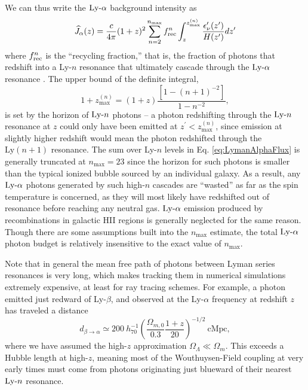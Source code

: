 We can thus write the $\text{Ly-}\alpha$ background intensity as
\begin{equation}
    \widehat{J}_{\alpha}(z) = \frac{c}{4\pi} (1 + z)^2 \sum_{n = 2}^{n_{\text{max}}} f_{\text{rec}}^{n} \int_z^{z_{\max}^{(n)}} \frac{\epsilon_{\nu}^{\prime}(z^{\prime})}{H(z^{\prime})} dz^{\prime} \label{eq:LymanAlphaFlux}
\end{equation}
where $f_{\text{rec}}^{n}$ is the ``recycling fraction,'' that is, the fraction of photons that redshift into a Ly-$n$ resonance that ultimately cascade through the $\text{Ly-}\alpha$ resonance \cite{Pritchard2006}. The upper bound of the definite integral,
\begin{equation}
    1 + z_{\max}^{(n)} = (1 + z) \frac{\left[1 - (n + 1)^{-2}\right]}{1 - n^{-2}} ,
\end{equation}
is set by the horizon of $\text{Ly-}n$ photons -- a photon redshifting through the  $\text{Ly-}n$ resonance at $z$ could only have been emitted at $z^{\prime} < z_{\max}^{(n)}$, since emission at slightly higher redshift would mean the photon redshifted through the $\text{Ly}(n+1)$ resonance. The sum over Ly-$n$ levels in Eq. \ref{eq:LymanAlphaFlux} is generally truncated at $n_{\max}=23$ \cite{Barkana2005} since the horizon for such photons is smaller than the typical ionized bubble sourced by an individual galaxy. As a result, any $\text{Ly-}\alpha$ photons generated by such high-$n$ cascades are ``wasted'' as far as the spin temperature is concerned, as they will most likely have redshifted out of resonance before reaching any neutral gas. $\text{Ly-}\alpha$ emission produced by recombinations in galactic HII regions is generally neglected for the same reason. Though there are some assumptions built into the $n_{\max}$ estimate, the total $\text{Ly-}\alpha$ photon budget is relatively insensitive to the exact value of $n_{\max}$.

Note that in general the mean free path of photons between Lyman series resonances is very long, which makes tracking them in numerical simulations  extremely expensive, at least for ray tracing schemes. For example, a photon emitted just redward of Ly-$\beta$, and observed at the Ly-$\alpha$ frequency at redshift $z$ has traveled a distance
\begin{equation}
	d_{\beta\rightarrow \alpha} \simeq 200 \ h_{70}^{-1} \left(\frac{\Omega_{m,0}}{0.3} \frac{1+z}{20} \right)^{-1/2} \ \mathrm{cMpc},
\end{equation}
where we have assumed the high-$z$ approximation $\Omega_{\Lambda} \ll \Omega_m$. This exceeds a Hubble length at high-$z$, meaning most of the Wouthuysen-Field coupling at very early times must come from photons originating just blueward of their nearest $\text{Ly-}n$ resonance.

